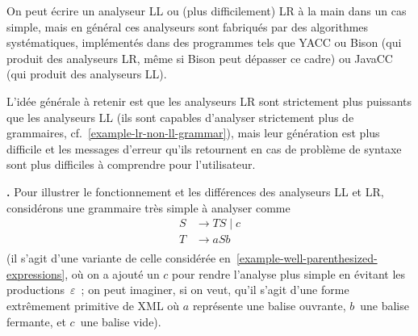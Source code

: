 \documentclass[12pt,a4paper]{article}
\theoremstyle{definition}
\newcommand\thingy{%
\refstepcounter{comcnt}\medskip\noindent\textbf{\thecomcnt.} }
\begin{document}
\smallskip

On peut écrire un analyseur LL ou (plus difficilement) LR à la main
dans un cas simple, mais en général ces analyseurs sont fabriqués par
des algorithmes systématiques, implémentés dans des programmes tels
que YACC ou Bison (qui produit des analyseurs LR, même si Bison peut
dépasser ce cadre) ou JavaCC (qui produit des analyseurs LL).

\smallskip

L'idée générale à retenir est que les analyseurs LR sont strictement
plus puissants que les analyseurs LL (ils sont capables d'analyser
strictement plus de grammaires, cf. \ref{example-lr-non-ll-grammar}),
mais leur génération est plus difficile et les messages d'erreur
qu'ils retournent en cas de problème de syntaxe sont plus difficiles à
comprendre pour l'utilisateur.

\thingy\label{example-ll-and-lr-analysis} Pour illustrer le
fonctionnement et les différences des analyseurs LL et LR, considérons
une grammaire très simple à analyser comme
\[
\begin{aligned}
S &\rightarrow TS \;|\; c\\
T &\rightarrow aSb\\
\end{aligned}
\]
(il s'agit d'une variante de celle considérée
en \ref{example-well-parenthesized-expressions}, où on a ajouté un $c$
pour rendre l'analyse plus simple en évitant les
productions $\varepsilon$ ; on peut imaginer, si on veut, qu'il s'agit
d'une forme extrêmement primitive de XML où $a$ représente une balise
ouvrante, $b$ une balise fermante, et $c$ une balise vide).

\medskip
\end{document}
